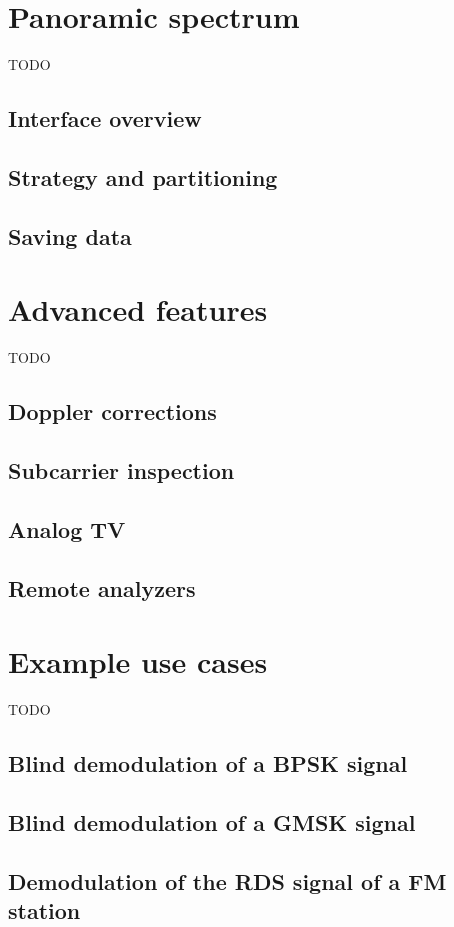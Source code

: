 \documentclass{ol-softwaremanual}
\begin{document}
\chapter{Panoramic spectrum}
TODO
\section{Interface overview}
\section{Strategy and partitioning}
\section{Saving data}

\chapter{Advanced features}
TODO
\section{Doppler corrections}
\section{Subcarrier inspection}
\section{Analog TV}
\section{Remote analyzers}

\appendix

\chapter{Example use cases}
TODO
\section{Blind demodulation of a BPSK signal}
\section{Blind demodulation of a GMSK signal}
\section{Demodulation of the RDS signal of a FM station}
\end{document}
